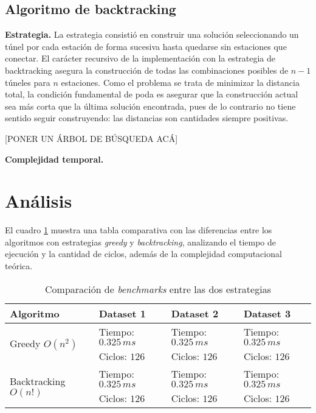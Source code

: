 \documentclass[10 pt, A4paper]{article}
\begin{document}
	\subsection*{Algoritmo de backtracking}

	\textbf{Estrategia.} La estrategia consistió en construir una solución seleccionando un túnel por cada estación de forma sucesiva hasta quedarse sin estaciones que conectar. El carácter recursivo de la implementación con la estrategia de backtracking asegura la construcción de todas las combinaciones posibles de $n-1$ túneles para $n$ estaciones. Como el problema se trata de minimizar la distancia total, la condición fundamental de poda es asegurar que la construcción actual sea más corta que la última solución encontrada, pues de lo contrario no tiene sentido seguir construyendo: las distancias son cantidades siempre positivas. 
	
	[PONER UN ÁRBOL DE BÚSQUEDA ACÁ]
	
	\textbf{Complejidad temporal.} 
	
	\section*{Análisis}
	El cuadro \ref{table} muestra una tabla comparativa con las diferencias entre los algoritmos con estrategias \textit{greedy} y \textit{backtracking}, analizando el tiempo de ejecución y la cantidad de ciclos, además de la complejidad computacional teórica.
	
	\begin{table}[h!]
		\centering
		\begin{tabular}{|p{4cm} | p{3cm} | p{3cm} | p{3cm}|}
			\hline
			Algoritmo & Dataset 1 & Dataset 2 & Dataset 3 \\
			\hline
			\multirow{2}{1em}{Greedy $O(n^2)$} & Tiempo: $0.325\,ms$ & Tiempo: $0.325\,ms$& Tiempo: $0.325\,ms$ \\ & Ciclos: $126$ & Ciclos: $126$ & Ciclos: $126$ \\
			\hline
			\multirow{2}{1em}{Backtracking $O(n!)$} & Tiempo: $0.325\,ms$& Tiempo: $0.325\,ms$& Tiempo: $0.325\,ms$\\ & Ciclos: $126$ & Ciclos: $126$ & Ciclos: $126$ \\
			\hline
		\end{tabular}
		\caption{Comparación de \textit{benchmarks} entre las dos estrategias}
		\label{table}
	\end{table}
	
\end{document}
